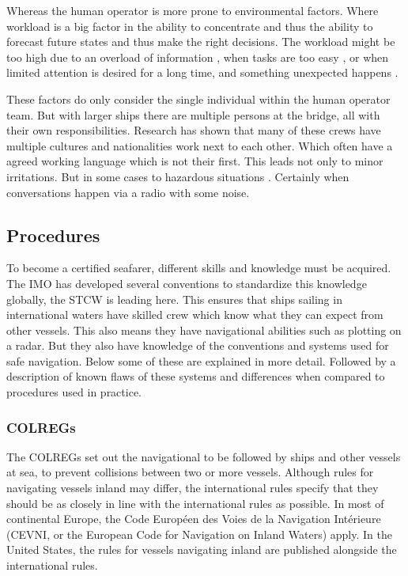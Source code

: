 Whereas the human operator is more prone to environmental factors. Where workload is a big factor in the ability to concentrate and thus the ability to forecast future states and thus make the right decisions. The workload might be too high due to an overload of information \cite{Speier1999}, when tasks are too easy \cite{Washburn2001}, or when limited attention is desired for a long time, and something unexpected happens \cite{McMorris2018}.

These factors do only consider the single individual within the human operator team. But with larger ships there are multiple persons at the bridge, all with their own responsibilities. Research has shown that many of these crews have multiple cultures and nationalities work next to each other. Which often have a agreed working language which is not their first. This leads not only to minor irritations. But in some cases to hazardous situations \cite{Hetherington2006}. Certainly when conversations happen via a radio with some noise. 

\subsection{Procedures}
To become a certified seafarer, different skills and knowledge must be acquired. The \ac{IMO} has developed several conventions to standardize this knowledge globally, the \ac{STCW} is leading here. This ensures that ships sailing in international waters have skilled crew which know what they can expect from other vessels. This also means they have navigational abilities such as plotting on a radar. But they also have knowledge of the conventions and systems used for safe navigation. Below some of these are explained in more detail. Followed by a description of known flaws of these systems and differences when compared to procedures used in practice.

\subsubsection{\acf{COLREGs}}
The \ac{COLREGs} set out the navigational to be followed by ships and other vessels at sea, to prevent collisions between two or more vessels. Although rules for navigating vessels inland may differ, the international rules specify that they should be as closely in line with the international rules as possible. In most of continental Europe, the Code Européen des Voies de la Navigation Intérieure (CEVNI, or the European Code for Navigation on Inland Waters) apply. In the United States, the rules for vessels navigating inland are published alongside the international rules.

